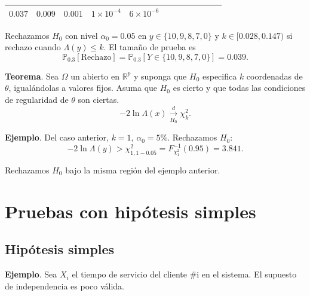 \documentclass[
  12pt,
]{book}
\begin{document}
\begin{longtable}[]{@{}llllllllllll@{}}
\begin{minipage}[t]{0.06\columnwidth}
\(0.037\)\strut
\end{minipage} & \begin{minipage}[t]{0.06\columnwidth}\raggedright
\(0.009\)\strut
\end{minipage} & \begin{minipage}[t]{0.06\columnwidth}\raggedright
\(0.001\)\strut
\end{minipage} & \begin{minipage}[t]{0.05\columnwidth}\raggedright
\(1\times 10^{-4}\)\strut
\end{minipage} & \begin{minipage}[t]{0.05\columnwidth}\raggedright
\(6\times10^{-6}\)\strut
\end{minipage}\tabularnewline
\bottomrule
\end{longtable}

Rechazamos \(H_0\) con nivel \(\alpha_0 = 0.05\) en \(y \in\{10,9,8,7,0\}\) y \(k\in [0.028,0.147)\) si rechazo cuando \(\Lambda(y)\leq k\). El tamaño de prueba es
\[\mathbb P_{0.3}[\text{Rechazo}] = \mathbb{P}_{0.3}[Y\in \{10,9,8,7,0\}] = 0.039.\]

\textbf{Teorema}. Sea \(\Omega\) un abierto en \(\mathbb R^p\) y suponga que \(H_0\) especifica \(k\) coordenadas de \(\theta\), igualándolas a valores fijos. Asuma que \(H_0\) es cierto y que todas las condiciones de regularidad de \(\theta\) son ciertas.
\[-2\ln\Lambda(x)\xrightarrow[H_0]{d}\chi^2_k.\]

\textbf{Ejemplo}. Del caso anterior, \(k=1\), \(\alpha_0 = 5\%\). Rechazamos \(H_0\):
\[-2\ln \Lambda(y)>\chi^2_{1,1-0.05} = F^{-1}_{\chi^2_1}(0.95) = 3.841.\]

Rechazamos \(H_0\) bajo la misma región del ejemplo anterior.

\hypertarget{pruebas-con-hipuxf3tesis-simples}{%
\chapter{Pruebas con hipótesis simples}\label{pruebas-con-hipuxf3tesis-simples}}

\hypertarget{hipuxf3tesis-simples}{%
\section{Hipótesis simples}\label{hipuxf3tesis-simples}}

\textbf{Ejemplo}. Sea \(X_i\) el tiempo de servicio del cliente \#i en el sistema. El supuesto de independencia es poco válida.
\end{document}
